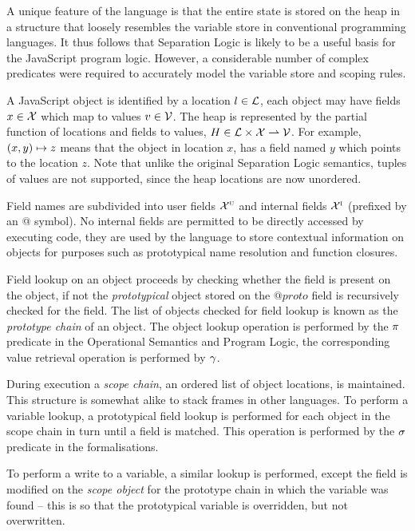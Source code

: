 \documentclass[a4paper,notitlepage]{report}
\begin{document}
  A unique feature of the
  language is that the entire state is stored on the heap in a structure that
  loosely resembles the variable store in conventional programming languages. It
  thus follows that Separation Logic is likely to be a useful basis for the
  JavaScript program logic. However, a considerable number of complex predicates
  were required to accurately model the variable store and scoping rules.


  A JavaScript object is identified by a location $l \in \mathcal{L}$, each object may
  have fields $x \in \mathcal{X}$ which map to values $v \in \mathcal{V}$. The heap is
  represented by the partial function of locations and fields to
  values, $H \in \mathcal{L} \times \mathcal{X} \rightharpoonup \mathcal{V}$. For example, $(x, y)
  \mapsto z$ means that the object in location $x$, has a field named $y$
  which points to the location $z$. Note that unlike the original Separation
  Logic semantics, tuples of values are not supported, since the heap locations
  are now unordered.

  Field names are subdivided into user fields $\mathcal{X}^{\textsc{u}}$ and internal fields
  $\mathcal{X}^{\textsc{i}}$ (prefixed by an @ symbol). No internal fields are permitted to be
  directly accessed by executing code, they are used by the language to store
  contextual information on objects for purposes such as prototypical name
  resolution and function closures.

  Field lookup on an object proceeds by checking whether the field is present on
  the object, if not the \emph{prototypical} object stored on the $@proto$ field
  is recursively checked for the field. The list of
  objects checked for field lookup is known as the \emph{prototype chain}
  of an object. The object lookup operation is performed by the $\pi$
  predicate in the Operational Semantics and Program Logic, the corresponding
  value retrieval operation is performed by $\gamma$.

  During execution a \emph{scope chain}, an ordered list of object locations, is
  maintained. This structure is somewhat alike to stack frames in other languages.
  To perform a variable lookup, a prototypical field lookup is performed for
  each object in the scope chain in turn until a field is matched. This
  operation is performed by the $\sigma$ predicate in the formalisations.

  To perform a write to a variable, a similar lookup is performed, except the
  field is modified on the \emph{scope object} for the prototype chain in which the
  variable was found -- this is so that the prototypical variable is overridden,
  but not overwritten.
\end{document}
